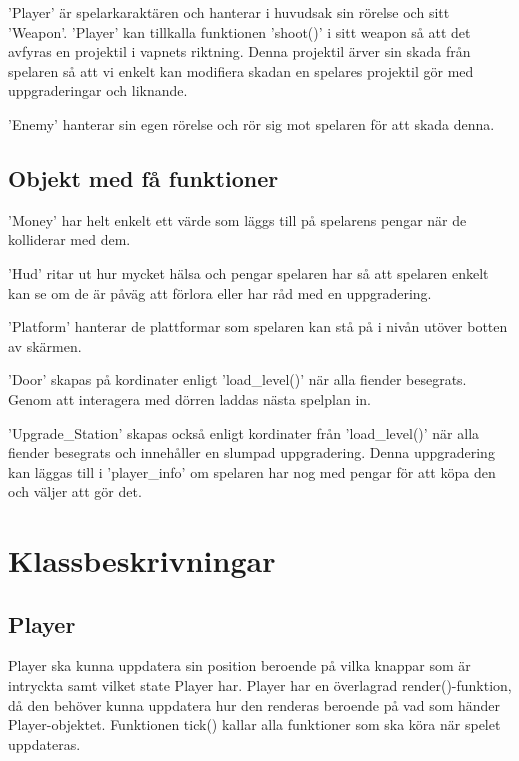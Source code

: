 \documentclass{TDP005mall}
\begin{document}
'Player' är spelarkaraktären och hanterar i huvudsak sin rörelse och sitt 'Weapon'. 'Player' kan tillkalla funktionen 'shoot()' i sitt weapon så att det avfyras en projektil i vapnets riktning. Denna projektil ärver sin skada från spelaren så att vi enkelt kan modifiera skadan en spelares projektil gör med uppgraderingar och liknande.

'Enemy' hanterar sin egen rörelse och rör sig mot spelaren för att skada denna.

\subsection{Objekt med få funktioner}
'Money' har helt enkelt ett värde som läggs till på spelarens pengar när de kolliderar med dem. 

'Hud' ritar ut hur mycket hälsa och pengar spelaren har så att spelaren enkelt kan se om de är påväg att förlora eller har råd med en uppgradering. 

'Platform' hanterar de plattformar som spelaren kan stå på i nivån utöver botten av skärmen. 

'Door' skapas på kordinater enligt 'load\_level()' när alla fiender besegrats. Genom att interagera med dörren laddas nästa spelplan in. 

'Upgrade\_Station' skapas också enligt kordinater från 'load\_level()' när alla fiender besegrats och innehåller en slumpad uppgradering. Denna uppgradering kan läggas till i 'player\_info' om spelaren har nog med pengar för att köpa den och väljer att gör det.

\section{Klassbeskrivningar}
\subsection{Player}
Player ska kunna uppdatera sin position beroende på vilka knappar som är intryckta samt vilket state Player har.
Player har en överlagrad render()-funktion, då den behöver kunna uppdatera hur den renderas beroende på vad som händer Player-objektet.
Funktionen tick() kallar alla funktioner som ska köra när spelet uppdateras. 
\end{document}
